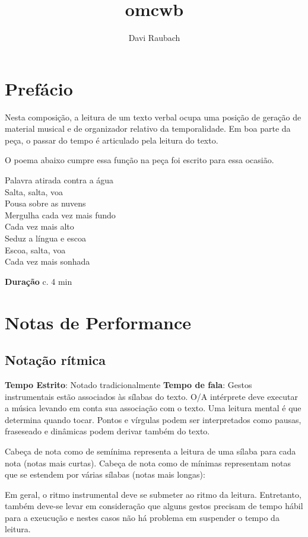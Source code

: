 \documentclass[a4paper]{article}
\author{Davi Raubach}
\date{}
\title{omcwb}
\begin{document}
\maketitle



\section*{Prefácio}
\label{sec:org2d2effd}
Nesta composição, a leitura de um texto verbal ocupa uma posição de geração de material musical e de organizador relativo da temporalidade. Em boa parte da peça, o passar do tempo é articulado pela leitura do texto.

O poema abaixo cumpre essa função na peça foi escrito para essa ocasião.

Palavra atirada contra a água \\
Salta, salta, voa\\
Pousa sobre as nuvens\\
Mergulha cada vez mais fundo\\
Cada vez mais alto\\
Seduz a língua e escoa\\
Escoa, salta, voa\\
Cada vez mais sonhada

\textbf{Duração} c. 4 min

\section*{Notas de Performance}
\label{sec:org9440280}

\subsection*{Notação rítmica}
\label{sec:org1b02727}

\textbf{Tempo Estrito}: Notado tradicionalmente
\textbf{Tempo de fala}: Gestos instrumentais estão associados às sílabas do texto. O/A intérprete deve executar a música levando em conta sua associação com o texto. Uma leitura mental é que determina quando tocar. Pontos e vírgulas podem ser interpretados como pausas, fraseseado e dinâmicas podem derivar também do texto.

Cabeça de nota como de semínima representa a leitura de uma sílaba para cada nota (notas mais curtas). Cabeça de nota como de mínimas representam notas que se estendem por várias sílabas (notas mais longas):

\begin{center}

\end{center}

Em geral, o ritmo instrumental deve se submeter ao ritmo da leitura. Entretanto, também deve-se levar em consideração que alguns gestos precisam de tempo hábil para a exeucução e nestes casos não há problema em suspender o tempo da leitura.




\end{document}
